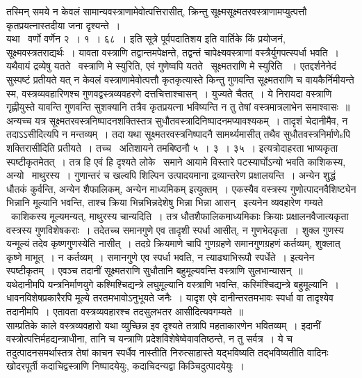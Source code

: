 \documentclass[11pt, openany]{book}
\begin{document}
तस्मिन् समये न केवलं सामान्यवस्त्राणामेवोत्पत्तिरासीत्, क्रिन्तु सूक्ष्मसूक्ष्मतरवस्त्राणामप्युत्पत्तौ कृतप्रयत्नास्तदीया जना दृश्यन्ते~।\\

यथा \textendash\ वर्णो वर्णेन २~। १~। ६८~। इति सूत्रे पूर्वपदातिशय इति वार्तिके {\qt किं प्रयोजनं, सूक्ष्मवस्त्रतराद्यर्थः~। यावता वस्त्राणि तद्वान्तमपेक्षन्ते, तद्वन्तं चापेक्ष्यवस्त्राणां वस्त्रैर्युगपत्स्पर्धा भवति~। यथैवायं द्रव्येषु यतते \textendash\ वस्त्राणि मे स्युरिति, एवं गुणेष्वपि यतते \textendash\ सूक्ष्मतराणि मे स्युरिति }~। एतद्दर्शनेनेदं सुस्पष्टं प्रतीयते यत् न केवलं वस्त्राणामेवोत्पत्तौ कृतकृत्यास्ते किन्तु गुणवन्ति सूक्ष्मतराणि च वायकैर्निमीयन्ते स्म, वस्त्रव्यवहारिणश्च गुणवद्वस्त्रव्यवहरणे दत्तचित्ताश्चासन्~। युज्यते चैतत्~। ये निरायदा वस्त्राणि गृह्नीयुस्ते यावन्ति गुणवन्ति सुशक्यानि तत्रैव कृतप्रयत्ना भविष्यन्ति न तु तेषां वस्त्रमात्रलाभेन समाश्वासः~॥ अन्यच्च यत्र सूक्ष्मतरवस्त्रनिष्पादनशक्तिस्तत्र सुधौतवस्त्रादिनिष्पादनमप्यावश्यकम्~। तादृशं चेदानीमैव, न तदाऽऽसीदित्यपि न मन्तव्यम्~। तदा यथा सूक्ष्मतरवस्त्रनिष्पादनै सामर्थ्यमासीत् तथैव सुधौतवस्त्रनिर्माणेsपि शक्तिरासीदिति प्रतीयते~। तच्च \textendash\ अतिशायने तमबिष्ठनौ ५~। ३~। ३५~। इत्यत्रोदाहरता भाष्यकृता स्पष्टीकृतमेतत्~। तत्र हि {\qt एवं हि दृश्यते लोके \textendash\ समाने आयामे विस्तारे पटस्यार्घोऽन्यो भवति काशिकस्य, अन्यो \textendash\ माथुरस्य~। गुणान्तरं च खल्वपि शिल्पिन उत्पादयमाना द्रव्यान्तरेण प्रक्षालयन्ति~। अन्येन शुद्धं धौतकं कुर्वन्ति, अन्येन शैफालिकम्, अन्येन माध्यमिकम्} इत्युक्तम्~। एकस्यैव वस्त्रस्य गुणोत्पादनवैशिष्ट्येन भिन्नानि मूल्यानि भवन्ति, ताश्च क्रिया भिन्नभिन्नदेशेषु भिन्ना भिन्ना आसन् \textendash\ इत्यनेन व्यवहारेण गम्यते \textendash\ काशिकस्य मूल्यमन्यत्, माथुरस्य चान्यदिति~। तत्र धौतशैफालिकमाध्यमिकाः क्रियाः प्रक्षालनवैजात्यकृता वस्त्रस्य गुणविशेषकराः~। तदेतच्च समानगुणे एव तादृशी स्पर्धा आसीत्, न गुणभेदकृता~। शुक्ल गुणस्य यन्मूल्यं तदेव कृष्णगुणस्येति नासीत्~। तदग्रे क्रियमाणे चापि गुणग्रहणे समानगुणग्रहणं कर्तव्यम्, शुक्लात् कृष्णे माभूत्~। न कर्तव्यम्~। समानगुणे एव स्पर्धा भवति, न त्याढ्याभिरूपौ स्पर्धेते~। इत्यनेन स्पष्टीकृतम्~। एवञ्च तदानीं सूक्ष्मतराणि सुधौतानि बहुमूल्यवन्ति वस्त्राणि सुलभान्यासन्~॥\\

यथेदानीमपि यन्त्रनिर्माणयुगे कश्मिश्चिद्यन्त्रे लघुमूल्यानि वस्त्राणि भवन्ति, कस्मिंश्चिद्यन्त्रे बहुमूल्यानि~। धावनविशेषप्रकारैरपि मूल्ये तरतमभावोऽनुभूयते जनैः~। यादृश एवे दानीन्तरतमभावः स्पर्धा वा तादृश्येव तदानीमपि~। एतावता वस्त्रव्यवहारश्च तदसुलभतर आसीदित्यवगम्यते~॥\\

साम्प्रतिके काले वस्त्रव्यवहारो यथा व्युच्छिन्न इव दृश्यते तत्रापि महताकारणेन भवितव्यम्~। इदानीं वस्त्रोत्पत्तिर्महद्यन्त्राधीना, तानि च यन्त्राणि प्रदेशविशेषेष्वेवावतिष्ठन्ते, न तु सर्वत्र~। ये च तदुत्पादनसमर्थास्तत्र तेषां काचन स्पर्धैव नास्तीति निरुत्साहास्ते यद्भविष्यति तद्भविष्यतीति वादिनः खोदरपूर्ती कदाचिद्वस्त्राणि निष्पादयेयुः, कदाचिदन्यद्वा किञ्चिदुत्पादयेयुः~।\\
\end{document}
